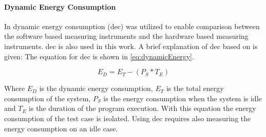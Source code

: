\paragraph{Dynamic Energy Consumption}
In \cite{biksbois} dynamic energy consumption (dec) was utilized to enable comparison between the software based measuring instruments and the hardware based measuring instruments. dec is also used in this work. A brief explanation of dec based on \cite{biksbois} is given:
The equation for dec is shown in \cref{eq:dynamicEnergy}.

\begin{equation}\label{eq:dynamicEnergy}
    E_D = E_T - (P_S * T_E)
\end{equation}

Where $E_D$ is the dynamic energy consumption, $E_T$ is the total energy consumption of the system, $P_S$ is the energy consumption when the system is idle and $T_E$ is the duration of the program execution.\cite{biksbois} With this equation the energy consumption of the test case is isolated. Using dec requires also measuring the energy consumption on an idle case. 
